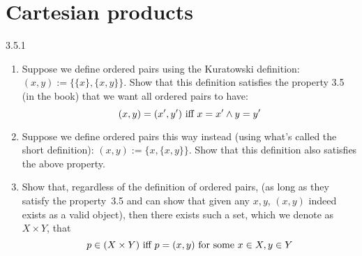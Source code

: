 \section{Cartesian products}
\begin{exercise}{3.5.1}
	\begin{enumerate}
		\item
		Suppose we define ordered pairs using the Kuratowski definition: $(x,y) := \{\{x\}, \{x,y\}\}$. Show that this definition satisfies the property 3.5 (in the book) that we want all ordered pairs to have:
		\[
			(x,y) = (x',y') \hbox{ iff } x = x' \wedge y = y'
		\]
		
		\item
		Suppose we define ordered pairs this way instead (using what's called the short definition): $(x,y) := \{x, \{x,y\}\}$. Show that this definition also satisfies the above property.
		
		\item Show that, regardless of the definition of ordered pairs, (as long as they satisfy the property~3.5 and can show that given any $x,y$, $(x,y)$ indeed exists as a valid object), then there exists such a set, which we denote as $X \times Y$, that
		\[
			p \in (X \times Y) \hbox{ iff } p = (x,y) \hbox{ for some } x \in X, y \in Y
		\]
	\end{enumerate}
\end{exercise}
